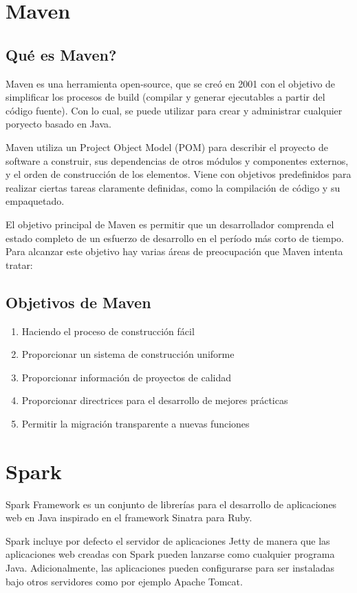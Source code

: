 \documentclass[12pt]{report}
\begin{document}
\section*{Maven}
\subsection*{Qu\'e es Maven?}

Maven es una herramienta open-source, que se cre\'o en 2001 con el objetivo de simplificar los procesos de build (compilar y generar ejecutables a partir del c\'odigo fuente). Con lo cual, se puede utilizar para crear y administrar cualquier poryecto basado en Java.

Maven utiliza un Project Object Model (POM) para describir el proyecto de software a construir, sus dependencias de otros m\'odulos y componentes externos, y el orden de construcci\'on de los elementos. Viene con objetivos predefinidos para realizar ciertas tareas claramente definidas, como la compilaci\'on de c\'odigo y su empaquetado.

El objetivo principal de Maven es permitir que un desarrollador comprenda el estado completo de un esfuerzo de desarrollo en el per\'iodo m\'as corto de tiempo. Para alcanzar este objetivo hay varias \'areas de preocupaci\'on que Maven intenta tratar:

\subsection*{Objetivos de Maven}
\begin{enumerate}
   \item  Haciendo el proceso de construcción f\'acil
   \item  Proporcionar un sistema de construcci\'on uniforme
   \item  Proporcionar informaci\'on de proyectos de calidad
   \item  Proporcionar directrices para el desarrollo de mejores pr\'acticas
   \item  Permitir la migraci\'on transparente a nuevas funciones
\end{enumerate}
     
\section*{Spark}

Spark Framework es un conjunto de librer\'ias para el desarrollo de aplicaciones web en Java inspirado en el framework Sinatra para Ruby.

Spark incluye por defecto el servidor de aplicaciones Jetty de manera que las aplicaciones web creadas con Spark pueden lanzarse como cualquier programa Java. Adicionalmente, las aplicaciones pueden configurarse para ser instaladas bajo otros servidores como por ejemplo Apache Tomcat.
\end{document}
